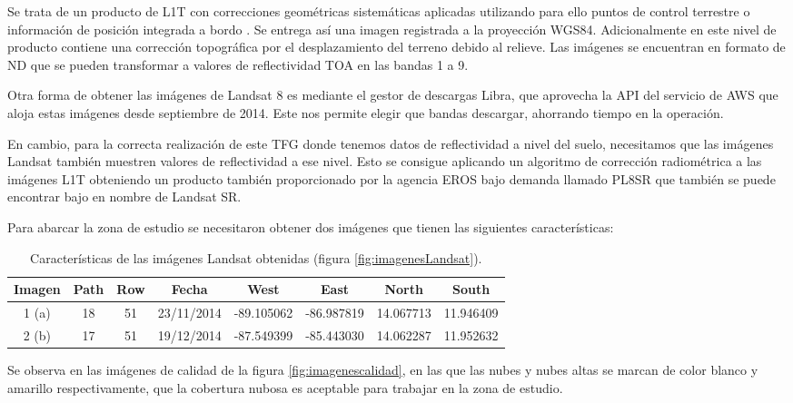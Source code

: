 Se trata de un producto de \ac{L1T} con correcciones geométricas sistemáticas aplicadas utilizando para ello puntos de control terrestre o información de posición integrada a bordo \citep{Ariza2013}. Se entrega así una imagen registrada a la proyección WGS84. Adicionalmente en este nivel de producto contiene una corrección topográfica por el desplazamiento del terreno debido al relieve. Las imágenes se encuentran en formato de \ac{ND} que se pueden transformar a valores de reflectividad \ac{TOA} en las bandas 1 a 9.\Sep

Otra forma de obtener las imágenes de Landsat 8 es mediante el gestor de descargas Libra, que aprovecha la API del servicio de \ac{AWS} que aloja estas imágenes desde septiembre de 2014. Este nos permite elegir que bandas descargar, ahorrando tiempo en la operación.\Sep

En cambio, para la correcta realización de este \ac{TFG} donde tenemos datos de reflectividad a nivel del suelo, necesitamos que las imágenes Landsat también muestren valores de reflectividad a ese nivel. Esto se consigue aplicando un algoritmo de corrección radiométrica a las imágenes \ac{L1T} obteniendo un producto también proporcionado por la agencia \ac{EROS} bajo demanda llamado \ac{PL8SR} \citep{USGS2015} que también se puede encontrar bajo en nombre de Landsat SR.\Sep

Para abarcar la zona de estudio se necesitaron obtener dos imágenes que tienen las siguientes características:

\begin{table}[ht]
	\centering
	\caption[Caracerísticas de las imágenes Landsat]{Características de las imágenes Landsat obtenidas (figura \ref{fig:imagenesLandsat}).}
	\begin{tabular}{@{}cccccccc@{}}
	\toprule[0.4mm]
	Imagen & Path & Row & Fecha & West & East & North & South \\
	\midrule
	1 (a) & 18 & 51 & 23/11/2014 & -89.105062 & -86.987819 & 14.067713 & 11.946409 \\
	2 (b) & 17 & 51 & 19/12/2014 & -87.549399 & -85.443030 & 14.062287 & 11.952632 \\
	\bottomrule[0.4mm]
	\end{tabular}
	\label{tab:imagenes}
\end{table}

Se observa en las imágenes de calidad de la figura \ref{fig:imagenescalidad}, en las que las nubes y nubes altas se marcan de color blanco y amarillo respectivamente, que la cobertura nubosa es aceptable para trabajar en la zona de estudio.\Sep


